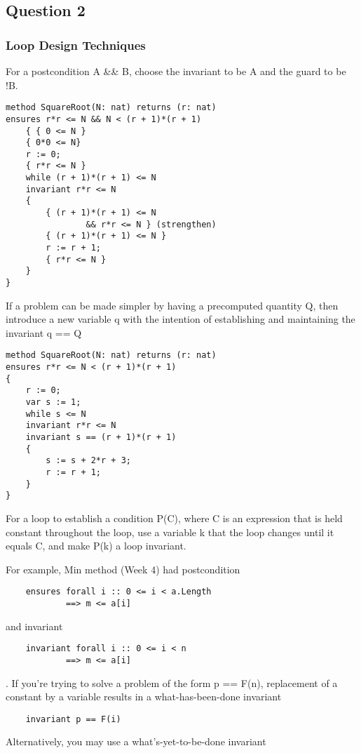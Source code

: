 \subsection{Question 2}
\subsubsection{Loop Design Techniques}
For a postcondition A \&\& B,
choose the invariant to be A and the guard to be !B.
\begin{verbatim}
method SquareRoot(N: nat) returns (r: nat)
ensures r*r <= N && N < (r + 1)*(r + 1)
    { { 0 <= N }
    { 0*0 <= N}
    r := 0;
    { r*r <= N }
    while (r + 1)*(r + 1) <= N
    invariant r*r <= N
    {
        { (r + 1)*(r + 1) <= N 
                && r*r <= N } (strengthen)
        { (r + 1)*(r + 1) <= N }
        r := r + 1;
        { r*r <= N }
    }
}
\end{verbatim}

If a problem can be made simpler by having a
precomputed quantity Q, then introduce a new
variable q with the intention of establishing and
maintaining the invariant q == Q

\begin{verbatim}
method SquareRoot(N: nat) returns (r: nat)
ensures r*r <= N < (r + 1)*(r + 1)
{
    r := 0;
    var s := 1;
    while s <= N
    invariant r*r <= N
    invariant s == (r + 1)*(r + 1)
    {
        s := s + 2*r + 3;
        r := r + 1;
    }
}
\end{verbatim}

For a loop to establish a condition P(C), where C is an
expression that is held constant throughout the loop,
use a variable k that the loop changes until it equals C,
and make P(k) a loop invariant.

For example, Min method (Week 4) had postcondition
\begin{verbatim}
    ensures forall i :: 0 <= i < a.Length 
            ==> m <= a[i]
\end{verbatim}
and invariant
\begin{verbatim}
    invariant forall i :: 0 <= i < n 
            ==> m <= a[i]
\end{verbatim}

.
If you're trying to solve a problem of the form
p == F(n), replacement of a constant by a variable
results in a what-has-been-done invariant
\begin{verbatim}
    invariant p == F(i)
\end{verbatim}
Alternatively, you may use a what's-yet-to-be-done
invariant

